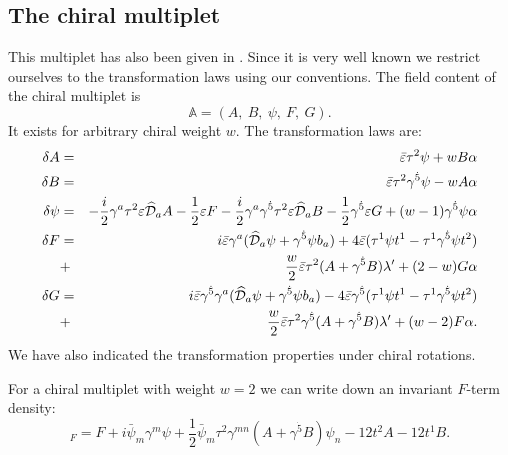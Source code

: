 \documentclass[a4paper,12pt, twoside]{article}
\numberwithin{equation}{section}
\begin{document}
\subsection{The chiral multiplet}\label{chm}
This multiplet has also been given in \cite{Sohnius:1983xs}. Since it 
is very well known we restrict ourselves to the transformation laws 
using our conventions. The field content of the chiral multiplet is
\[
\mathbb{A}=(A,~B,~\psi,~F,~G).
\]
It exists for arbitrary chiral weight $w$. The transformation laws are:
\begin{eqnarray*}
\delta A & = & \bar{\varepsilon}\tau^2 \psi+wB\alpha\\
 \delta B &  = & \bar{\varepsilon}\tau^2 
\gamma^{\dot{5}}\psi-wA\alpha\\
\delta \psi & = &-\frac{i}{2}\gamma^a\tau^2 \varepsilon\widehat{\cal 
D}_a A-\frac{1}{2}\varepsilon F-\frac{i}{2}\gamma^a\gamma^{\dot{5}}\tau^2  
\varepsilon \widehat{\cal D}_a B 
-\frac{1}{2}\gamma^{\dot{5}}\varepsilon G+(w-1)\gamma^{\dot{5}}\psi \alpha\\
\delta F & = & i\bar{\varepsilon}\gamma^a(\widehat{\cal 
D}_a\psi+\gamma^{\dot{5}}\psi b_a) +4 \bar{\varepsilon}(\tau^1\psi 
t^1-\tau^1\gamma^{\dot{5}}\psi t^2)\\
& + & \frac{w}{2}\bar{\varepsilon}\tau^2 ( A 
+\gamma^{\dot{5}}B)\lambda'+(2-w)G\alpha\\
\delta G & = & i\bar{\varepsilon}\gamma^{\dot{5}}\gamma^a(\widehat{\cal 
D}_a\psi+\gamma^{\dot{5}}\psi b_a)  
-4\bar{\varepsilon}\gamma^{\dot{5}}(\tau^1\psi t^1-\tau^1\gamma^{\dot{5}}\psi t^2)\\
& + & \frac{w}{2}\bar{\varepsilon}\tau^2 \gamma^{\dot{5}}( A + 
\gamma^{\dot{5}}B)\lambda'+(w-2)F\alpha.
\end{eqnarray*}
We have also indicated the transformation properties under chiral 
rotations.

For a chiral multiplet with weight $w=2$ we can write down an invariant 
$F$-term density:
\begin{equation}
[\mathbb{A}]_F = 
F+i\bar{\psi}_m\gamma^m\psi+\frac{1}{2}\bar{\psi}_m\tau^2 \gamma^{mn}(A+\gamma^{\dot{5}}B)\psi_n-12 t^2A-12 
t^1B\label{chiral}.   
\end{equation}
\end{document}
